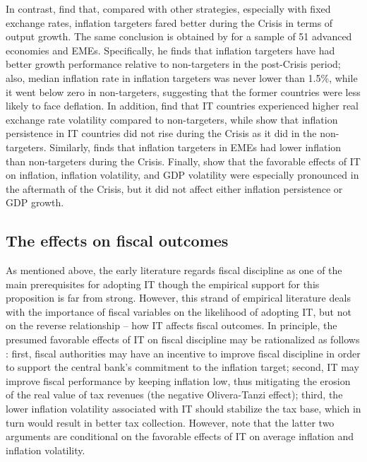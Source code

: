 \documentclass{article}
\begin{document}
In contrast, \citet{barnebeck2015} find that, compared with other strategies, especially with fixed exchange rates, inflation targeters fared better during the Crisis in terms of output growth. The same conclusion is obtained by \citet{carvalho2011} for a sample of 51 advanced economies and EMEs. Specifically, he finds that inflation targeters have had better growth performance relative to non-targeters in the post-Crisis period; also, median inflation rate in inflation targeters was never lower than 1.5\%, while it went below zero in non-targeters, suggesting that the former countries were less likely to face deflation. In addition, \citet{kose2018} find that IT countries experienced higher real exchange rate volatility compared to non-targeters, while \citet{kocenda2018} show that inflation persistence in IT countries did not rise during the Crisis as it did in the non-targeters. Similarly, \citet{duong2021} finds that inflation targeters in EMEs had lower inflation than non-targeters during the Crisis. Finally, \citet{arsic2022} show that the favorable effects of IT on inflation, inflation volatility, and GDP volatility were especially pronounced in the aftermath of the Crisis, but it did not affect either inflation persistence or GDP growth.

\subsection{The effects on fiscal outcomes}

As mentioned above, the early literature regards fiscal discipline as one of the main prerequisites for adopting IT though the empirical support for this proposition is far from strong. However, this strand of empirical literature deals with the importance of fiscal variables on the likelihood of adopting IT, but not on the reverse relationship – how IT affects fiscal outcomes. In principle, the presumed favorable effects of IT on fiscal discipline may be rationalized as follows \citep{Minea_Tapsoba_2014}: first, fiscal authorities may have an incentive to improve fiscal discipline in order to support the central bank’s commitment to the inflation target; second, IT may improve fiscal performance by keeping inflation low, thus mitigating the erosion of the real value of tax revenues (the negative Olivera-Tanzi effect); third, the lower inflation volatility associated with IT should stabilize the tax base, which in turn would result in better tax collection. However, note that the latter two arguments are conditional on the favorable effects of IT on average inflation and inflation volatility.
\end{document}
